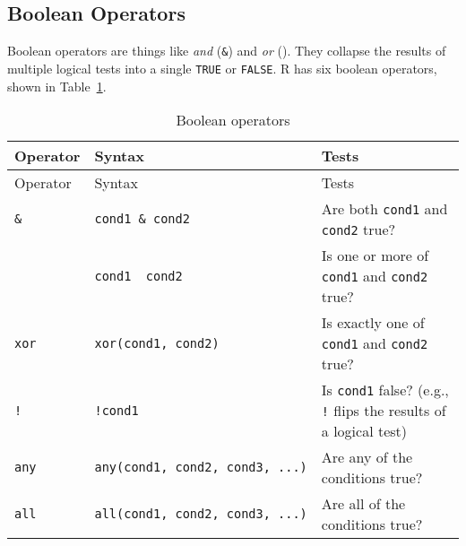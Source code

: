 \documentclass[
  letterpaper,
  DIV=11,
  numbers=noendperiod]{scrbook}
\begin{document}
\subsection{Boolean Operators}\label{boolean-operators}

Boolean operators are things like \emph{and} (\texttt{\&}) and \emph{or}
(\texttt{\textbar{}}). They collapse the results of multiple logical
tests into a single \texttt{TRUE} or \texttt{FALSE}. R has six boolean
operators, shown in Table~\ref{tbl-boole}.

\begin{longtable}[]{@{}
  >{\raggedright\arraybackslash}p{}
  >{\raggedright\arraybackslash}p{}
  >{\raggedright\arraybackslash}p{}@{}}
\caption{Boolean operators}\label{tbl-boole}\tabularnewline
\toprule\noalign{}
\begin{minipage}[b]{\linewidth}\raggedright
Operator
\end{minipage} & \begin{minipage}[b]{\linewidth}\raggedright
Syntax
\end{minipage} & \begin{minipage}[b]{\linewidth}\raggedright
Tests
\end{minipage} \\
\midrule\noalign{}
\endfirsthead
\toprule\noalign{}
\begin{minipage}[b]{\linewidth}\raggedright
Operator
\end{minipage} & \begin{minipage}[b]{\linewidth}\raggedright
Syntax
\end{minipage} & \begin{minipage}[b]{\linewidth}\raggedright
Tests
\end{minipage} \\
\midrule\noalign{}
\endhead
\bottomrule\noalign{}
\endlastfoot
\texttt{\&} & \texttt{cond1\ \&\ cond2} & Are both \texttt{cond1} and
\texttt{cond2} true? \\
\texttt{\textbar{}} & \texttt{cond1\ \textbar{}\ cond2} & Is one or more
of \texttt{cond1} and \texttt{cond2} true? \\
\texttt{xor} & \texttt{xor(cond1,\ cond2)} & Is exactly one of
\texttt{cond1} and \texttt{cond2} true? \\
\texttt{!} & \texttt{!cond1} & Is \texttt{cond1} false? (e.g.,
\texttt{!} flips the results of a logical test) \\
\texttt{any} & \texttt{any(cond1,\ cond2,\ cond3,\ ...)} & Are any of
the conditions true? \\
\texttt{all} & \texttt{all(cond1,\ cond2,\ cond3,\ ...)} & Are all of
the conditions true? \\
\end{longtable}
\end{document}
